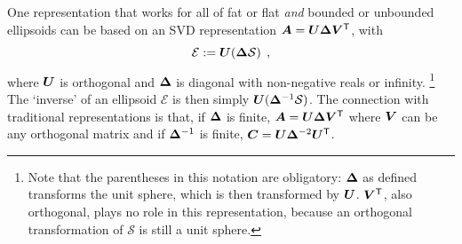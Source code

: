 One representation that works for all of fat or flat \emph{and} bounded or unbounded ellipsoids can be based on an SVD representation
$\bm{A}  = \bm{U} \bm{\Delta} \bm{V}^\mathsf{T}$, with
\begin{equation}
 \mathcal{E} := \bm{U} (\bm{\Delta} \mathcal{S}) \:\: ,
\end{equation}
where $\bm{U}$ is orthogonal and $\bm{\Delta}$ is diagonal with non-negative reals or infinity.%
\footnote{
Note that the parentheses in this notation are obligatory: $\bm{\Delta}$ as defined transforms the
unit sphere, which is then transformed by $\bm{U}$. $\bm{V}^\mathsf{T}$, also orthogonal, plays no role
in this representation, because an orthogonal transformation of $\mathcal{S}$ is still a unit sphere.
}
The `inverse' of an ellipsoid $\mathcal{E}$ is then simply $\bm{U} (\bm{\Delta}^{-1} \mathcal{S})$.
The connection with traditional representations is that,
if $\bm{\Delta}$ is finite,
$\bm{A}  = \bm{U} \bm{\Delta} \bm{V}^\mathsf{T}$
where $\bm{V}$ can be any orthogonal matrix and
if $\bm{\Delta}^{-1}$ is finite, $\bm{C} = \bm{U} \bm{\Delta}^{-2} \bm{U}^\mathsf{T}$.

